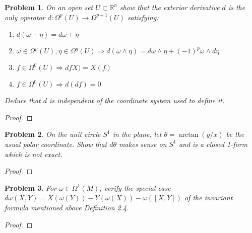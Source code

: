 \documentclass[10pt]{article}
\newcommand{\sk}{\vskip 10mm}
\newcommand{\bb}[1]{\mathbb{#1}}
\theoremstyle{plain}
\newtheorem{problem}{Problem}
\theoremstyle{remark}
\begin{document}
\begin{problem}
  On an open set $U\subset \bb{R^n}$ show that the exterior derivative $d$ is
  the only operator $d:\Omega^p(U)\rightarrow\Omega^{p+1}(U)$ satisfying:
  \begin{enumerate}
  \item[(a)] $d(\omega+\eta)=d\omega+\eta$
  \item[(b)] $\omega\in\Omega^p(U),\eta\in\Omega^q(U)\Rightarrow
    d(\omega\wedge \eta)=d\omega\wedge\eta+(-1)^p\omega\wedge d\eta$
  \item[(c)] $f\in\Omega^0(U)\Rightarrow dfX)=X(f)$
  \item[(d)] $f\in\Omega^0(U)\Rightarrow d(df)=0$
  \end{enumerate}
  Deduce that $d$ is independent of the coordinate system used to define it.
\end{problem}

\begin{proof}
  
\end{proof}

\sk

\begin{problem}
  On the unit circle $S^1$ in the plane, let $\theta=\arctan(y/x)$ be the usual
  polar coordinate. Show that $d\theta$ makes sense on $S^1$ and is a closed
  1-form which is not exact.
\end{problem}

\begin{proof}
  
\end{proof}

\sk

\begin{problem}
  For $\omega\in\Omega^1(M)$, verify the special case
  $d\omega(X,Y)=X(\omega(Y))-Y(\omega(X))-\omega([X,Y])$ of the invariant
  formula mentioned above Definition 2.4.
\end{problem}

\begin{proof}
  
\end{proof}

\end{document}
